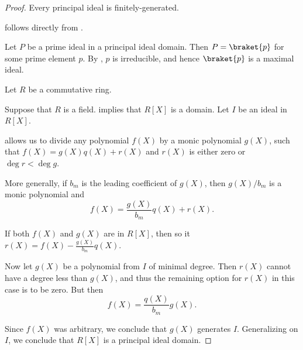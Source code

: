 \begin{proof}
   Every principal ideal is finitely-generated.

    follows directly from .

   Let \( P \) be a prime ideal in a principal ideal domain. Then \( P = \braket{ p } \) for some prime element \( p \). By , \( p \) is irreducible, and hence \( \braket{ p } \) is a maximal ideal.

   Let \( R \) be a commutative ring.

  \SufficiencySubProof* Suppose that \( R \) is a field.  implies that \( R[X] \) is a domain. Let \( I \) be an ideal in \( R[X] \).

   allows us to divide any polynomial \( f(X) \) by a monic polynomial \( g(X) \), such that \( f(X) = g(X) q(X) + r(X) \) and \( r(X) \) is either zero or \( \deg r < \deg g \).

  More generally, if \( b_m \) is the leading coefficient of \( g(X) \), then \( g(X) / b_m \) is a monic polynomial and
  \begin{equation*}
    f(X) = \frac {g(X)} {b_m} q(X) + r(X).
  \end{equation*}

  If both \( f(X) \) and \( g(X) \) are in \( R[X] \), then so it \( r(X) = f(X) - \frac {g(X)} {b_m} q(X) \).

  Now let \( g(X) \) be a polynomial from \( I \) of minimal degree. Then \( r(X) \) cannot have a degree less than \( g(X) \), and thus the remaining option for \( r(X) \) in this case is to be zero. But then
  \begin{equation*}
    f(X) = \frac {q(X)} {b_m} g(X).
  \end{equation*}

  Since \( f(X) \) was arbitrary, we conclude that \( g(X) \) generates \( I \). Generalizing on \( I \), we conclude that \( R[X] \) is a principal ideal domain.


\end{proof}
